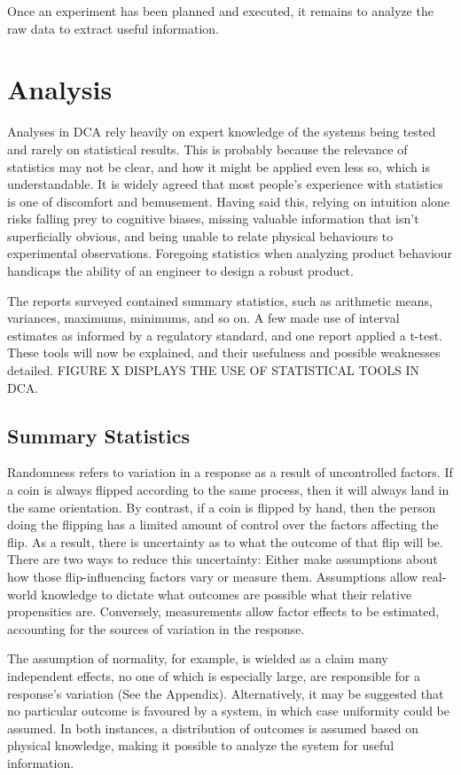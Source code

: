 \documentclass[11pt,a4paper,article]{memoir} %
\begin{document}
Once an experiment has been planned and executed, it remains to analyze the raw data to extract useful information.

\vspace{48pt}
\section{Analysis}
Analyses in DCA rely heavily on expert knowledge of the systems being tested and rarely on statistical results. This is probably because the relevance of statistics may not be clear, and how it might be applied even less so, which is understandable. It is widely agreed that most people's experience with statistics is one of discomfort and bemusement. Having said this, relying on intuition alone risks falling prey to cognitive biases, missing valuable information that isn't superficially obvious, and being unable to relate physical behaviours to experimental observations. Foregoing statistics when analyzing product behaviour handicaps the ability of an engineer to design a robust product.
\par
The reports surveyed contained summary statistics, such as arithmetic means, variances, maximums, minimums, and so on. A few made use of interval estimates as informed by a regulatory standard, and one report applied a t-test. These tools will now be explained, and their usefulness and possible weaknesses detailed. FIGURE X DISPLAYS THE USE OF STATISTICAL TOOLS IN DCA.
\par
\subsection*{Summary Statistics}
 Randomness refers to variation in a response as a result of uncontrolled factors. If a coin is always flipped according to the same process, then it will always land in the same orientation. By contrast, if a coin is flipped by hand, then the person doing the flipping has a limited amount of control over the factors affecting the flip. As a result, there is uncertainty as to what the outcome of that flip will be. There are two ways to reduce this uncertainty: Either make assumptions about how those flip-influencing factors vary or measure them. Assumptions allow real-world knowledge to dictate what outcomes are possible what their relative propensities are. Conversely, measurements allow factor effects to be estimated, accounting for the sources of variation in the response.
 
  The assumption of normality, for example, is wielded as a claim many independent effects, no one of which is especially large, are responsible for a response's variation (See the Appendix). Alternatively, it may be suggested that no particular outcome is favoured by a system, in which case uniformity could be assumed. In both instances, a distribution of outcomes is assumed based on physical knowledge, making it possible to analyze the system for useful information.
 
\end{document}
